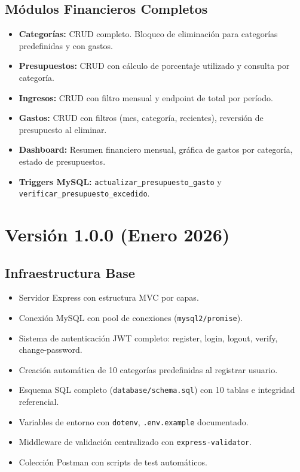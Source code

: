 \subsection*{Módulos Financieros Completos}

\begin{itemize}[leftmargin=1.5cm]
  \item \textbf{Categorías:} CRUD completo. Bloqueo de eliminación para categorías predefinidas y con gastos.
  \item \textbf{Presupuestos:} CRUD con cálculo de porcentaje utilizado y consulta por categoría.
  \item \textbf{Ingresos:} CRUD con filtro mensual y endpoint de total por período.
  \item \textbf{Gastos:} CRUD con filtros (mes, categoría, recientes), reversión de presupuesto al eliminar.
  \item \textbf{Dashboard:} Resumen financiero mensual, gráfica de gastos por categoría, estado de presupuestos.
  \item \textbf{Triggers MySQL:} \texttt{actualizar\_presupuesto\_gasto} y \texttt{verificar\_presupuesto\_excedido}.
\end{itemize}

\section{Versión 1.0.0 (Enero 2026)}

\subsection*{Infraestructura Base}

\begin{itemize}[leftmargin=1.5cm]
  \item Servidor Express con estructura MVC por capas.
  \item Conexión MySQL con pool de conexiones (\texttt{mysql2/promise}).
  \item Sistema de autenticación JWT completo: register, login, logout, verify, change-password.
  \item Creación automática de 10 categorías predefinidas al registrar usuario.
  \item Esquema SQL completo (\texttt{database/schema.sql}) con 10 tablas e integridad referencial.
  \item Variables de entorno con \texttt{dotenv}, \texttt{.env.example} documentado.
  \item Middleware de validación centralizado con \texttt{express-validator}.
  \item Colección Postman con scripts de test automáticos.
\end{itemize}

